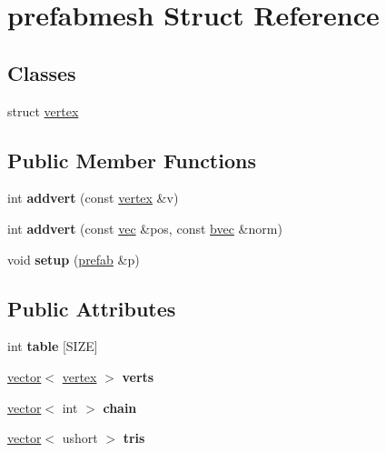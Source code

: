 \hypertarget{structprefabmesh}{}\section{prefabmesh Struct Reference}
\label{structprefabmesh}
\subsection*{Classes}
\begin{DoxyCompactItemize}
\item 
struct \hyperlink{structprefabmesh_1_1vertex}{vertex}
\end{DoxyCompactItemize}
\subsection*{Public Member Functions}
\begin{DoxyCompactItemize}
\item 
\mbox{\label{structprefabmesh_a2610cd61bae086aafdd22d75456301ed}} 
int {\bfseries addvert} (const \hyperlink{structprefabmesh_1_1vertex}{vertex} \&v)
\item 
\mbox{\label{structprefabmesh_a8054ae92df5151048e8a5d26ce57d452}} 
int {\bfseries addvert} (const \hyperlink{structvec}{vec} \&pos, const \hyperlink{structbvec}{bvec} \&norm)
\item 
\mbox{\label{structprefabmesh_af12ddb1cf84549d3070f9a42583e7a17}} 
void {\bfseries setup} (\hyperlink{structprefab}{prefab} \&p)
\end{DoxyCompactItemize}
\subsection*{Public Attributes}
\begin{DoxyCompactItemize}
\item 
\mbox{\label{structprefabmesh_abb612b451509bb21e4babe56cc15c80a}} 
int {\bfseries table} \mbox{[}S\+I\+ZE\mbox{]}
\item 
\mbox{\label{structprefabmesh_acd5561a1f30bef52287f762d2ec2b186}} 
\hyperlink{structvector}{vector}$<$ \hyperlink{structprefabmesh_1_1vertex}{vertex} $>$ {\bfseries verts}
\item 
\mbox{\label{structprefabmesh_ae591ec45dd1cd36728f7b0b7436718b3}} 
\hyperlink{structvector}{vector}$<$ int $>$ {\bfseries chain}
\item 
\mbox{\label{structprefabmesh_ab0007eeadb15f0eeafda0d1ec7584ec6}} 
\hyperlink{structvector}{vector}$<$ ushort $>$ {\bfseries tris}
\end{DoxyCompactItemize}
